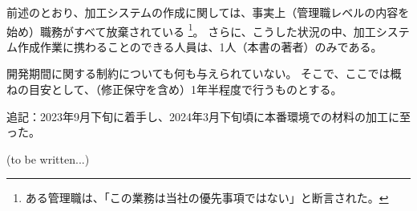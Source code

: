 




前述のとおり、加工システムの作成に関しては、事実上（管理職レベルの内容を始め）職務がすべて放棄されている
\footnote{ある管理職は、「この業務は当社の優先事項ではない」と断言された。}。
さらに、こうした状況の中、加工システム作成作業に携わることのできる人員は、1人（本書の著者）のみである。



開発期間に関する制約についても何も与えられていない。
そこで、ここでは概ねの目安として、（修正保守を含め）1年半程度で行うものとする。
\begin{marker}
追記：2023年9月下旬に着手し、2024年3月下旬頃に本番環境での材料の加工に至った。
\end{marker}



(to be written...)


